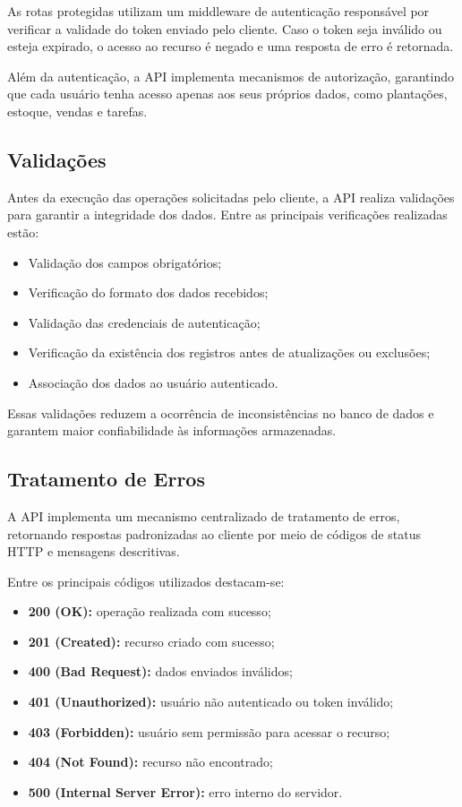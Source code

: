 \documentclass[12pt]{article}
\begin{document}
As rotas protegidas utilizam um middleware de autenticação responsável por verificar a validade do token enviado pelo cliente. Caso o token seja inválido ou esteja expirado, o acesso ao recurso é negado e uma resposta de erro é retornada.

Além da autenticação, a API implementa mecanismos de autorização, garantindo que cada usuário tenha acesso apenas aos seus próprios dados, como plantações, estoque, vendas e tarefas.

\subsection{Validações}

Antes da execução das operações solicitadas pelo cliente, a API realiza validações para garantir a integridade dos dados. Entre as principais verificações realizadas estão:

\begin{itemize}
  \item Validação dos campos obrigatórios;
  \item Verificação do formato dos dados recebidos;
  \item Validação das credenciais de autenticação;
  \item Verificação da existência dos registros antes de atualizações ou exclusões;
  \item Associação dos dados ao usuário autenticado.
\end{itemize}

Essas validações reduzem a ocorrência de inconsistências no banco de dados e garantem maior confiabilidade às informações armazenadas.

\subsection{Tratamento de Erros}

A API implementa um mecanismo centralizado de tratamento de erros, retornando respostas padronizadas ao cliente por meio de códigos de status HTTP e mensagens descritivas.

Entre os principais códigos utilizados destacam-se:

\begin{itemize}
  \item \textbf{200 (OK):} operação realizada com sucesso;
  \item \textbf{201 (Created):} recurso criado com sucesso;
  \item \textbf{400 (Bad Request):} dados enviados inválidos;
  \item \textbf{401 (Unauthorized):} usuário não autenticado ou token inválido;
  \item \textbf{403 (Forbidden):} usuário sem permissão para acessar o recurso;
  \item \textbf{404 (Not Found):} recurso não encontrado;
  \item \textbf{500 (Internal Server Error):} erro interno do servidor.
\end{itemize}
\end{document}
